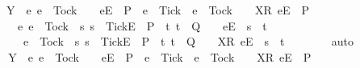 \begin{isabellebody}
\ \ \ \ \ \ {\isacharequal}\ Y\ {\isasyminter}\ {\isacharparenleft}{\isacharbraceleft}e{\isachardot}\ e\ {\isasymnoteq}\ Tock\ {\isasymand}\ {\isasymrho}\ {\isacharat}\ {\isacharbrackleft}{\isacharbrackleft}e{\isacharbrackright}\isactrlsub E{\isacharbrackright}\ {\isasymin}\ P\ {\isasymand}\ e\ {\isasymnoteq}\ Tick\ {\isasymor}\ e\ {\isacharequal}\ Tock\ {\isasymand}\ {\isasymrho}\ {\isacharat}\ {\isacharbrackleft}{\isacharbrackleft}X{\isacharbrackright}\isactrlsub R{\isacharcomma}\ {\isacharbrackleft}e{\isacharbrackright}\isactrlsub E{\isacharbrackright}\ {\isasymin}\ P{\isacharbraceright}\isanewline
\ \ \ \ \ \ \ \ {\isasymunion}\ {\isacharbraceleft}e{\isachardot}\ e\ {\isasymnoteq}\ Tock\ {\isasymand}\ {\isacharparenleft}{\isasymexists}s{\isachardot}\ s\ {\isacharat}\ {\isacharbrackleft}{\isacharbrackleft}Tick{\isacharbrackright}\isactrlsub E{\isacharbrackright}\ {\isasymin}\ P\ {\isasymand}\ {\isacharparenleft}{\isasymexists}t{\isachardot}\ t\ {\isasymin}\ Q\ {\isasymand}\ {\isasymrho}\ {\isacharat}\ {\isacharbrackleft}{\isacharbrackleft}e{\isacharbrackright}\isactrlsub E{\isacharbrackright}\ {\isacharequal}\ s\ {\isacharat}\ t{\isacharparenright}{\isacharparenright}\ {\isasymor}\isanewline
\ \ \ \ \ \ \ \ \ \ e\ {\isacharequal}\ Tock\ {\isasymand}\ {\isacharparenleft}{\isasymexists}s{\isachardot}\ s\ {\isacharat}\ {\isacharbrackleft}{\isacharbrackleft}Tick{\isacharbrackright}\isactrlsub E{\isacharbrackright}\ {\isasymin}\ P\ {\isasymand}\ {\isacharparenleft}{\isasymexists}t{\isachardot}\ t\ {\isasymin}\ Q\ {\isasymand}\ {\isasymrho}\ {\isacharat}\ {\isacharbrackleft}{\isacharbrackleft}X{\isacharbrackright}\isactrlsub R{\isacharcomma}\ {\isacharbrackleft}e{\isacharbrackright}\isactrlsub E{\isacharbrackright}\ {\isacharequal}\ s\ {\isacharat}\ t{\isacharparenright}{\isacharparenright}{\isacharbraceright}{\isacharparenright}{\isachardoublequoteclose}\isanewline
\ \ \ \ \ \ \isamarkupfalse%
\ auto\isanewline
\ \ \ \ \isamarkupfalse%
\ \isamarkupfalse%
\ {\isachardoublequoteopen}Y\ {\isasyminter}\ {\isacharparenleft}{\isacharbraceleft}e{\isachardot}\ e\ {\isasymnoteq}\ Tock\ {\isasymand}\ {\isasymrho}\ {\isacharat}\ {\isacharbrackleft}{\isacharbrackleft}e{\isacharbrackright}\isactrlsub E{\isacharbrackright}\ {\isasymin}\ P\ {\isasymand}\ e\ {\isasymnoteq}\ Tick\ {\isasymor}\ e\ {\isacharequal}\ Tock\ {\isasymand}\ {\isasymrho}\ {\isacharat}\ {\isacharbrackleft}{\isacharbrackleft}X{\isacharbrackright}\isactrlsub R{\isacharcomma}\ {\isacharbrackleft}e{\isacharbrackright}\isactrlsub E{\isacharbrackright}\ {\isasymin}\ P{\isacharbraceright}\isanewline

\end{isabellebody}
